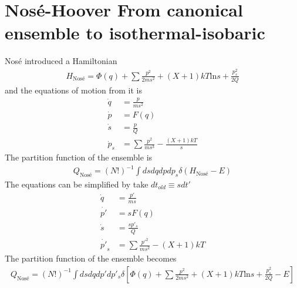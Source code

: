 \documentclass{article}
\begin{document}
\section{Nos\'e-Hoover	From canonical ensemble to isothermal-isobaric}
Nos\'e introduced a Hamiltonian
\begin{align}
H_{\text{Nos\'e}}=\Phi(q)+\sum\frac{p^2}{2ms^2}+(X+1)kT\text{ln}s+\frac{p_s^2}{2Q}
\end{align}
and the equations of motion from it is
\begin{align}
\dot{q}&=\frac{p}{ms^2}\nonumber\\
\dot{p}&=F(q)\nonumber\\
\dot{s}&=\frac{p}{Q}\\
\dot{p}_s&=\sum\frac{p^2}{ms^3}-\frac{(X+1)kT}{s}\nonumber
\end{align}
The partition function of the ensemble is
\begin{align}
Q_{\text{Nos\'e}}=(N!)^{-1}\int dsdqdpdp_s\delta(H_{\text{Nos\'e}}-E)
\end{align}
The equations can be simplified by take $dt_{old}\equiv sdt'$
\begin{align}
\dot{q}&=\frac{p'}{ms}\nonumber\\
\dot{p'}&=sF(q)\nonumber\\
\dot{s}&=\frac{sp'_s}{Q}\\
\dot{p'}_s&=\sum\frac{p'^2}{ms^2}-(X+1)kT\nonumber
\end{align}
The partition function of the ensemble becomes
\begin{align}
Q_{\text{Nos\'e}}=(N!)^{-1}\int dsdqdp'dp'_s\delta[
\Phi(q)+\sum\frac{p^2}{2ms^2}+(X+1)kT\text{ln}s+\frac{p_s^2}{2Q}-E]
\end{align}
\end{document}
